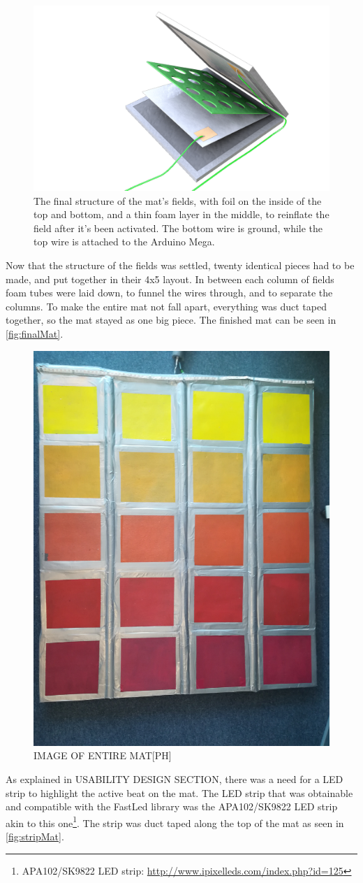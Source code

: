 	\begin{figure}[H]
		\centering
		\includegraphics[width=1\linewidth]{figure/Implementation/Medialogyp4mat}
		\caption{The final structure of the mat's fields, with foil on the inside of the top and bottom, and a thin foam layer in the middle, to reinflate the field after it's been activated. The bottom wire is ground, while the top wire is attached to the Arduino Mega.}
		\label{fig:finalField}
	\end{figure}

	Now that the structure of the fields was settled, twenty identical pieces had to be made, and put together in their 4x5 layout. In between each column of fields foam tubes were laid down, to funnel the wires through, and to separate the columns. To make the entire mat not fall apart, everything was duct taped together, so the mat stayed as one big piece. The finished mat can be seen in \autoref{fig:finalMat}.
	\begin{figure}[H]
		\centering
		\includegraphics[width=0.42\linewidth]{figure/Implementation/fullMat}
		\caption{IMAGE OF ENTIRE MAT[PH]}
		\label{fig:finalMat}
	\end{figure}
 	As explained in USABILITY DESIGN SECTION, there was a need for a LED strip to highlight the active beat on the mat. The LED strip that was obtainable and compatible with the FastLed library was the APA102/SK9822 LED strip akin to this one\footnote{APA102/SK9822 LED strip: \url{http://www.ipixelleds.com/index.php?id=125}}. The strip was duct taped along the top of the mat as seen in \autoref{fig:stripMat}.
 	

